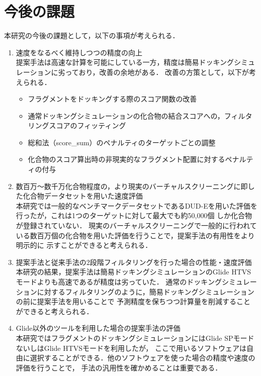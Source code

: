 \newpage

\section{今後の課題}
本研究の今後の課題として，以下の事項が考えられる．
\begin{enumerate}
\item 速度をなるべく維持しつつの精度の向上\\
	提案手法は高速な計算を可能にしている一方，精度は簡易ドッキングシミュレーションに劣っており，改善の余地がある．
	改善の方策として，以下が考えられる．
	\begin{itemize}
	\item フラグメントをドッキングする際のスコア関数の改善
	\item 通常ドッキングシミュレーションの化合物の結合スコアへの，フィルタリングスコアのフィッティング
	\item 総和法（score\_sum）のペナルティのターゲットごとの調整
	\item 化合物のスコア算出時の非現実的なフラグメント配置に対するペナルティの付与
	\end{itemize}
\item 数百万～数千万化合物程度の，より現実のバーチャルスクリーニングに即した化合物データセットを用いた速度評価\\
	本研究では一般的なベンチマークデータセットであるDUD-Eを用いた評価を行ったが，これは1つのターゲットに対して最大でも約50,000個
	しか化合物が登録されていない．
	現実のバーチャルスクリーニングで一般的に行われている数百万個の化合物を用いた評価を行うことで，提案手法の有用性をより明示的に
	示すことができると考えられる．
\item 提案手法と従来手法の2段階フィルタリングを行った場合の性能・速度評価\\
	本研究の結果，提案手法は簡易ドッキングシミュレーションのGlide HTVSモードよりも高速であるが精度は劣っていた．
	通常のドッキングシミュレーションに対するフィルタリングのように，簡易ドッキングシミュレーションの前に提案手法を用いることで
	予測精度を保ちつつ計算量を削減することができると考えられる．
\item Glide以外のツールを利用した場合の提案手法の評価\\
	本研究ではフラグメントのドッキングシミュレーションにはGlide SPモードないしはGlide HTVSモードを利用したが，
	ここで用いるソフトウェアは自由に選択することができる．他のソフトウェアを使った場合の精度や速度の評価を行うことで，
	手法の汎用性を確かめることは重要である．
\end{enumerate}

